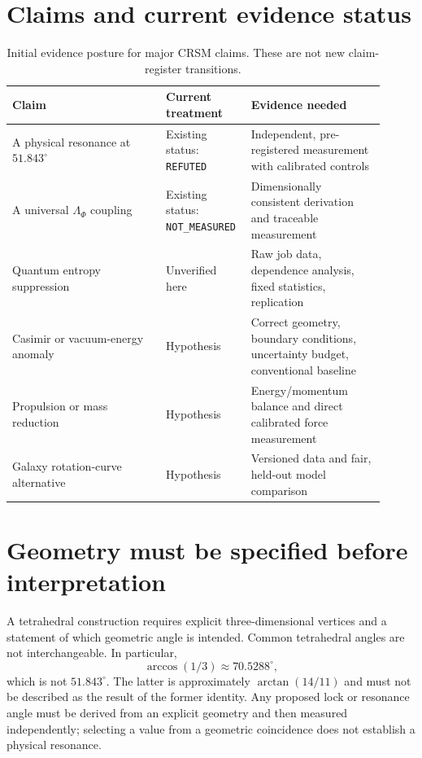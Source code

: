 \documentclass[aps,preprint,superscriptaddress,longbibliography]{revtex4-2}
\begin{document}
\section{Claims and current evidence status}

\begin{table}[h]
\centering
\caption{Initial evidence posture for major CRSM claims. These are not new
claim-register transitions.}
\begin{tabular}{p{0.39\linewidth}p{0.18\linewidth}p{0.34\linewidth}}
\toprule
Claim & Current treatment & Evidence needed \\
\midrule
A physical resonance at $51.843^\circ$ & Existing status: \texttt{REFUTED} & Independent, pre-registered measurement with calibrated controls \\
A universal $\Lambda_\Phi$ coupling & Existing status: \texttt{NOT\_MEASURED} & Dimensionally consistent derivation and traceable measurement \\
Quantum entropy suppression & Unverified here & Raw job data, dependence analysis, fixed statistics, replication \\
Casimir or vacuum-energy anomaly & Hypothesis & Correct geometry, boundary conditions, uncertainty budget, conventional baseline \\
Propulsion or mass reduction & Hypothesis & Energy/momentum balance and direct calibrated force measurement \\
Galaxy rotation-curve alternative & Hypothesis & Versioned data and fair, held-out model comparison \\
\bottomrule
\end{tabular}
\end{table}

\section{Geometry must be specified before interpretation}

A tetrahedral construction requires explicit three-dimensional vertices and
a statement of which geometric angle is intended. Common tetrahedral angles
are not interchangeable. In particular,
\begin{equation}
\arccos(1/3) \approx 70.5288^\circ,
\end{equation}
which is not $51.843^\circ$. The latter is approximately
$\arctan(14/11)$ and must not be described as the result of the former
identity. Any proposed lock or resonance angle must be derived from an
explicit geometry and then measured independently; selecting a value from
a geometric coincidence does not establish a physical resonance.
\end{document}
